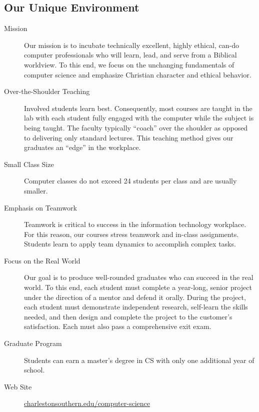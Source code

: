 \subsection{Our Unique Environment}
\begin{description}
	\item[Mission] Our mission is to incubate technically excellent, highly ethical, can-do computer professionals who will learn, lead, and serve from a Biblical worldview. To this end, we focus on the unchanging fundamentals of computer science and emphasize Christian character and ethical behavior.
	\item[Over-the-Shoulder Teaching] Involved students learn best. Consequently, most courses are taught in the lab with each student fully engaged with the computer while the subject is being taught. The faculty typically ``coach'' over the shoulder as opposed to delivering only standard lectures. This teaching method gives our graduates an “edge” in the workplace.
	\item[Small Class Size] Computer classes do not exceed 24 students per class and are usually smaller.
	\item[Emphasis on Teamwork] Teamwork is critical to success in the information technology workplace. For this reason, our courses stress teamwork and in-class assignments. Students learn to apply team dynamics to accomplish complex tasks.
	\item[Focus on the Real World] Our goal is to produce well-rounded graduates who can succeed in the real world.  To this end, each student must complete a year-long, senior project under the direction of a mentor and defend it orally. During the project, each student must demonstrate independent research, self-learn the skills needed, and then design and complete the project to the customer's satisfaction.  Each must also pass a comprehensive exit exam.
	\item[Graduate Program] Students can earn a master's degree in CS with only one additional year of school.
	\item[Web Site] \href{https://charlestonsouthern.edu/computer-science}{charlestonsouthern.edu/computer-science}
\end{description}